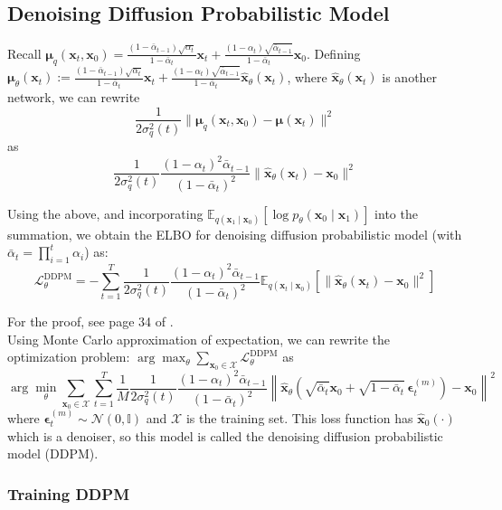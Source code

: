 \documentclass{article}
\newcommand{\x}{\mathbf{x}}
\newcommand{\N}{\mathcal{N}}
\newcommand{\E}{\mathbb{E}}
\begin{document}
	\subsection{Denoising Diffusion Probabilistic Model}

	Recall $\displaystyle \boldsymbol{\mu}_q (\x_t, \x_0) = \frac{(1 - \bar{\alpha}_{t-1}) \sqrt{\alpha_t}}{1 - \bar{\alpha}_t} \x_t + \frac{(1 - \alpha_t) \sqrt{\bar{\alpha}_{t-1}}}{1 - \bar{\alpha}_t} \x_0$. Defining $\displaystyle \boldsymbol{\mu}_\theta (\x_t) := \frac{(1 - \bar{\alpha}_{t-1}) \sqrt{\alpha_t}}{1 - \bar{\alpha}_t} \x_t + \frac{(1 - \alpha_t) \sqrt{\bar{\alpha}_{t-1}}}{1 - \bar{\alpha}_t} \hat{\x}_\theta (\x_t)$, where $\hat{\x}_\theta (\x_t)$ is another network, we can rewrite $$\displaystyle \frac{1}{2 \sigma_q^2(t)} \lVert 
	\boldsymbol{\mu}_q(\x_t, \x_0) - \boldsymbol{\mu}(\x_t)
	\rVert^2$$ as $$\displaystyle \frac{1}{2 \sigma_q^2(t)} \frac{(1 - \alpha_t)^2 \bar{\alpha}_{t-1}}{(1 - \bar{\alpha}_t)^2} \lVert \hat{\x}_\theta (\x_t) - \x_0 \rVert^2$$
	
	Using the above, and incorporating $\E_{q (\x_1 \mid \x_0)} \left[\log p_\theta (\x_0 \mid \x_1) \right]$ into the summation, we obtain the ELBO for denoising diffusion probabilistic model (with $\bar{\alpha}_t = \prod_{i=1}^t \alpha_i$) as: $$\mathcal{L}_\theta^{\mathrm{DDPM}} = - \sum_{t=1}^{T} \frac{1}{2 \sigma_q^2(t)} \frac{(1 - \alpha_t)^2 \bar{\alpha}_{t-1}}{(1 - \bar{\alpha}_t)^2} \E_{q (\x_t \mid \x_0)} \left[ \lVert \hat{\x}_\theta (\x_t) - \x_0 \rVert^2 \right]$$
	
	For the proof, see page 34 of \cite{chan2025}. \\
	
	Using Monte Carlo approximation of expectation, we can rewrite the optimization problem: $\arg\max_\theta \sum_{\x_0 \in \mathcal{X}} \mathcal{L}_\theta^{\mathrm{DDPM}}$ as
	$$ \arg\min_\theta \sum_{\x_0 \in \mathcal{X}} \sum_{t=1}^T \frac{1}{M} \frac{1}{2 \sigma_q^2(t)} \frac{(1 - \alpha_t)^2 \bar{\alpha}_{t-1}}{(1 - \bar{\alpha}_t)^2} \left\lVert \hat{\x}_\theta \left(\sqrt{\bar{\alpha}_t} \x_0 + \sqrt{1 - \bar{\alpha}_t} \, \boldsymbol{\epsilon}_t^{(m)} \right) - \x_0 \right\rVert^2 $$
	where $\boldsymbol{\epsilon}_t^{(m)} \sim \N (0, \mathbb{I})$ and $\mathcal{X}$ is the training set. This loss function has $\hat{\x}_0 (\cdot)$ which is a denoiser, so this model is called the denoising diffusion probabilistic model (DDPM).
	
	\subsubsection*{Training DDPM}
	
\end{document}
